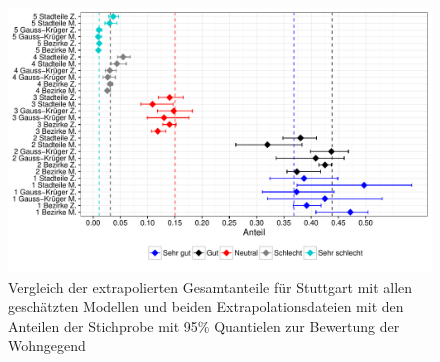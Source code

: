 \documentclass{Vorlage}
\begin{document}
\begin{figure}[h]
 \begin{center}
 \includegraphics[scale=0.8]{Pictures/WohngegendAlleModelle2}
 \caption{Vergleich der extrapolierten Gesamtanteile für Stuttgart mit allen geschätzten Modellen und beiden Extrapolationsdateien mit den Anteilen der Stichprobe mit 95\% Quantielen zur Bewertung der Wohngegend}
 \label{WAlle}
 \end{center}
\end{figure}
\end{document}
